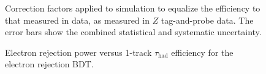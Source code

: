 \begin{figure}[htbp]
	\centering
	\caption{Correction factors applied to simulation to equalize the efficiency to that measured in data, as measured in $Z$ tag-and-probe data. The error bars show the combined statistical and systematic uncertainty.}
	\label{fig:reco-tau-efficiency-scale-factors}
\end{figure}

\begin{figure}
	\centering
	\caption{Electron rejection power versus 1-track $\tau_{\mathrm{had}}$ efficiency for the electron rejection BDT. }
	\label{fig:reco-tau-electron-rejection-efficiency}
\end{figure}

